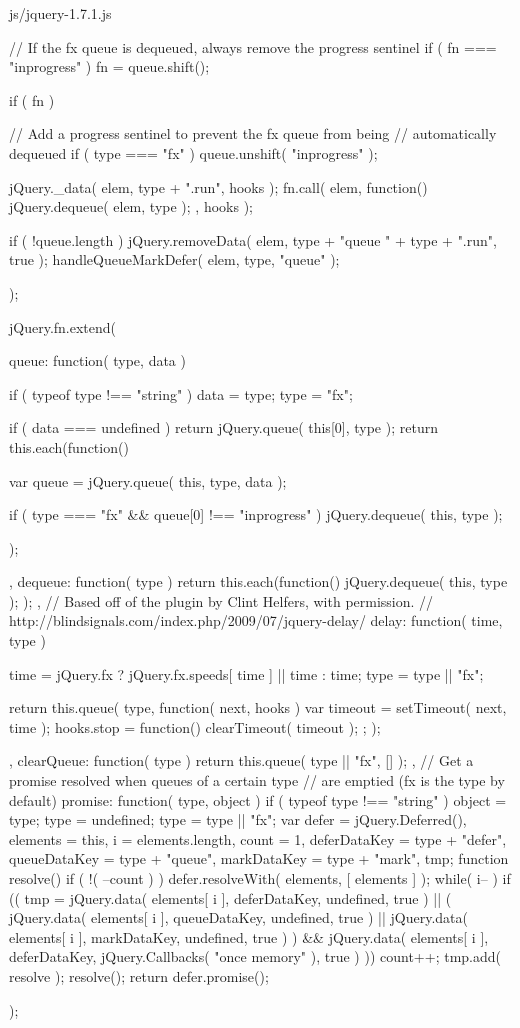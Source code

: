 \documentclass{article}
\begin{document}
\begin{chunk}{js/jquery-1.7.1.js}
{{{		// If the fx queue is dequeued, always remove the progress sentinel
		if ( fn === "inprogress" ) {
			fn = queue.shift();
		}

		if ( fn ) {
			// Add a progress sentinel to prevent the fx queue from being
			// automatically dequeued
			if ( type === "fx" ) {
				queue.unshift( "inprogress" );
			}

			jQuery._data( elem, type + ".run", hooks );
			fn.call( elem, function() {
				jQuery.dequeue( elem, type );
			}, hooks );
		}

		if ( !queue.length ) {
			jQuery.removeData( elem, type + "queue " + type + ".run", true );
			handleQueueMarkDefer( elem, type, "queue" );
		}
	}
});

jQuery.fn.extend({
	queue: function( type, data ) {
		if ( typeof type !== "string" ) {
			data = type;
			type = "fx";
		}

		if ( data === undefined ) {
			return jQuery.queue( this[0], type );
		}
		return this.each(function() {
			var queue = jQuery.queue( this, type, data );

			if ( type === "fx" && queue[0] !== "inprogress" ) {
				jQuery.dequeue( this, type );
			}
		});
	},
	dequeue: function( type ) {
		return this.each(function() {
			jQuery.dequeue( this, type );
		});
	},
	// Based off of the plugin by Clint Helfers, with permission.
	// http://blindsignals.com/index.php/2009/07/jquery-delay/
	delay: function( time, type ) {
		time = jQuery.fx ? jQuery.fx.speeds[ time ] || time : time;
		type = type || "fx";

		return this.queue( type, function( next, hooks ) {
			var timeout = setTimeout( next, time );
			hooks.stop = function() {
				clearTimeout( timeout );
			};
		});
	},
	clearQueue: function( type ) {
		return this.queue( type || "fx", [] );
	},
	// Get a promise resolved when queues of a certain type
	// are emptied (fx is the type by default)
	promise: function( type, object ) {
		if ( typeof type !== "string" ) {
			object = type;
			type = undefined;
		}
		type = type || "fx";
		var defer = jQuery.Deferred(),
			elements = this,
			i = elements.length,
			count = 1,
			deferDataKey = type + "defer",
			queueDataKey = type + "queue",
			markDataKey = type + "mark",
			tmp;
		function resolve() {
			if ( !( --count ) ) {
				defer.resolveWith( elements, [ elements ] );
			}
		}
		while( i-- ) {
			if (( tmp = jQuery.data( elements[ i ], deferDataKey, undefined, true ) ||
					( jQuery.data( elements[ i ], queueDataKey, undefined, true ) ||
						jQuery.data( elements[ i ], markDataKey, undefined, true ) ) &&
					jQuery.data( elements[ i ], deferDataKey, jQuery.Callbacks( "once memory" ), true ) )) {
				count++;
				tmp.add( resolve );
			}
		}
		resolve();
		return defer.promise();
	}
});




}
\end{chunk}
\end{document}
